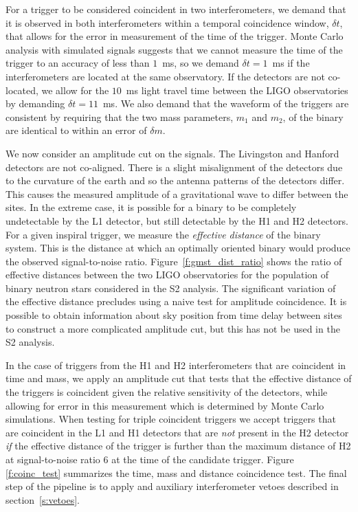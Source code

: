 For a trigger to be considered coincident in two interferometers, we demand
that it is observed in both interferometers within a temporal coincidence
window, $\delta t$, that allows for the error in measurement of the time of
the trigger. Monte Carlo analysis with simulated signals suggests that we
cannot measure the time of the trigger to an accuracy of less than $1$~ms, so
we demand $\delta t = 1$~ms if the interferometers are located at the same
observatory. If the detectors are not co-located, we allow for the $10$~ms
light travel time between the LIGO observatories by demanding $\delta t =
11$~ms. We also demand that the waveform of the triggers are consistent by
requiring that the two mass parameters, $m_1$ and $m_2$, of the binary are
identical to within an error of $\delta m$.

We now consider an amplitude cut on the signals. The Livingston and Hanford
detectors are not co-aligned. There is a slight misalignment of the detectors
due to the curvature of the earth and so the antenna patterns of the detectors
differ. This causes the measured amplitude of a gravitational wave to differ
between the sites. In the extreme case, it is possible for a binary to be
completely undetectable by the L1 detector, but still detectable by the H1 and
H2 detectors. For a given inspiral trigger, we measure the \emph{effective
distance} of the binary system. This is the distance at which an optimally
oriented binary would produce the observed signal-to-noise ratio.
Figure~\ref{f:gmst_dist_ratio} shows the ratio of effective distances between
the two LIGO observatories for the population of binary neutron stars
considered in the S2 analysis. The significant variation of the effective
distance precludes using a naive test for amplitude coincidence. It is
possible to obtain information about sky position from time delay between
sites to construct a more complicated amplitude cut, but this has not be used
in the S2 analysis.

In the case of triggers from the H1 and H2 interferometers that are coincident
in time and mass, we apply an amplitude cut that tests that the effective
distance of the triggers is coincident given the relative sensitivity of the
detectors, while allowing for error in this measurement which is determined by
Monte Carlo simulations.  When testing for triple coincident triggers we 
accept triggers that are coincident in the L1 and H1 detectors that are
\emph{not} present in the H2 detector \emph{if} the effective distance of the
trigger is further than the maximum distance of H2 at signal-to-noise ratio
$6$ at the time of the candidate trigger. Figure \ref{f:coinc_test} summarizes
the time, mass and distance coincidence test.  The final step of the pipeline
is to apply and auxiliary interferometer vetoes described in
section~\ref{s:vetoes}. 

